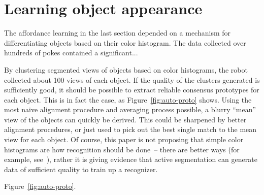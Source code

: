 
\section{Learning object appearance}

The affordance learning in the last section depended on a mechanism
for differentiating objects based on their color histogram.
The data collected over hundreds of pokes contained a significant...

By clustering segmented views of objects based on color histograms,
the robot collected about 100 views of each object.  
If the quality of the clusters generated is sufficiently good, it
should be possible to extract reliable consensus prototypes for each 
object.  This is in fact the case, as Figure~\ref{fig:auto-proto}
shows.  Using the most naive alignment procedure and averaging
process possible, a blurry ``mean'' view of the objects can
quickly be derived.  This could be sharpened by better alignment
procedures, or just used to pick out the best single match
to the mean view for each object.
%
Of course, this paper is not proposing
that simple color histograms
are how recognition should be done~--
there are better ways 
(for example, see~\cite{schiele00recognition}),
rather it is giving evidence that 
active segmentation can generate data of 
sufficient quality to train up a recognizer.


Figure~\ref{fig:auto-proto}.

